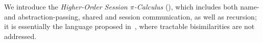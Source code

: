 \noindent 
We introduce the %
\emph{Higher-Order Session $\pi$-Calculus} (\HOp), which 
includes both name- and abstraction-passing, shared and session communication,  
as well as recursion; it is 
essentially 
the  language
proposed 
in~\cite{tlca07}, where tractable bisimilarities are not addressed. 

\smallskip





